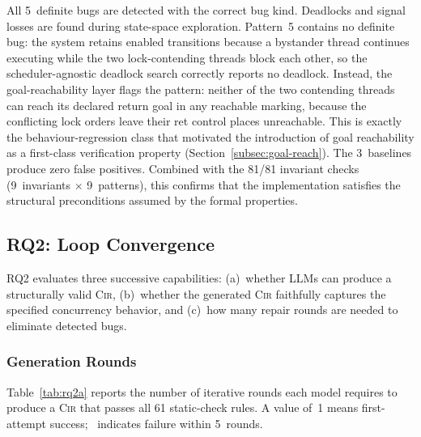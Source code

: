 All 5~definite bugs are detected with the correct bug kind. Deadlocks and signal losses are found during state-space exploration. Pattern~5 contains no definite bug: the system retains enabled transitions because a bystander thread continues executing while the two lock-contending threads block each other, so the scheduler-agnostic deadlock search correctly reports no deadlock. Instead, the goal-reachability layer flags the pattern: neither of the two contending threads can reach its declared return goal in any reachable marking, because the conflicting lock orders leave their \textsf{ret} control places unreachable. This is exactly the behaviour-regression class that motivated the introduction of goal reachability as a first-class verification property (Section~\ref{subsec:goal-reach}). The 3~baselines produce zero false positives. Combined with the 81/81 invariant checks (9~invariants $\times$ 9~patterns), this confirms that the implementation satisfies the structural preconditions assumed by the formal properties.


\subsection{RQ2: Loop Convergence}
\label{subsec:rq2}

RQ2 evaluates three successive capabilities:
(a)~whether LLMs can produce a structurally valid
\textsc{Cir},
(b)~whether the generated \textsc{Cir} faithfully captures
the specified concurrency behavior, and
(c)~how many repair rounds are needed to eliminate detected
bugs.

\subsubsection{Generation Rounds}
\label{subsubsec:rq2a}

Table~\ref{tab:rq2a} reports the number of iterative rounds each model requires to produce a \textsc{Cir} that passes all 61 static-check rules. A value of~1 means first-attempt success; ~indicates failure within 5~rounds.

